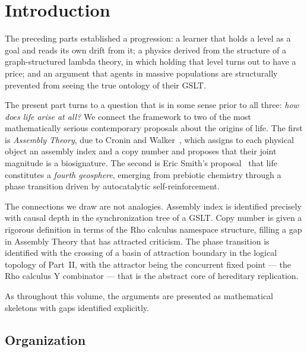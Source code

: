\chapter{Introduction}
\label{sec:origins-intro}

The preceding parts established a progression: a learner that holds a
level as a goal and reads its own drift from it; a physics derived from
the structure of a graph-structured lambda theory, in which holding that
level turns out to have a price; and an argument that agents in massive
populations are structurally prevented from seeing the true ontology of
their GSLT.

The present part turns to a question that is in some sense prior to
all three: \emph{how does life arise at all?}
We connect the framework to two of the most mathematically serious
contemporary proposals about the origins of life.
The first is \emph{Assembly Theory}, due to Cronin and
Walker~\cite{cronin2023assembly}, which assigns to each physical
object an assembly index and a copy number and proposes that
their joint magnitude is a biosignature.
The second is Eric Smith's proposal~\cite{smith2016origin} that
life constitutes a \emph{fourth geosphere}, emerging from prebiotic
chemistry through a phase transition driven by autocatalytic
self-reinforcement.

The connections we draw are not analogies.
Assembly index is identified precisely with causal depth in the
synchronization tree of a GSLT.
Copy number is given a rigorous definition in terms of the
Rho calculus namespace structure, filling a gap in Assembly
Theory that has attracted criticism.
The phase transition is identified with the crossing of a basin
of attraction boundary in the logical topology of Part~II,
with the attractor being the concurrent fixed point --- the
Rho calculus Y combinator --- that is the abstract core of
hereditary replication.

As throughout this volume, the arguments are presented as
mathematical skeletons with gaps identified explicitly.

\section{Organization}

